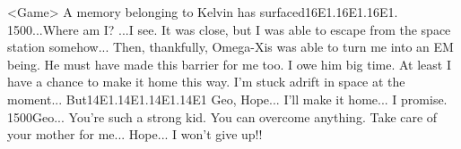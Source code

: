 <Game> A memory belonging to Kelvin has surfaced{16}{E1}.{16}{E1}.{16}{E1}. 
{15}{00}...Where am I? 
...I see. 
It was close, but I was able to escape from the space station somehow... 
Then, thankfully, Omega-Xis was able to turn me into an EM being. 
He must have made this barrier for me too. 
I owe him big time. 
At least I have a chance to make it home this way. 
I'm stuck adrift in space at the moment... 
But{14}{E1}.{14}{E1}.{14}{E1}.{14}{E1} 
Geo, Hope... 
I'll make it home... I promise. 
{15}{00}Geo... You're such a strong kid. 
You can overcome anything. 
Take care of your mother for me... Hope... 
I won't give up!! 

